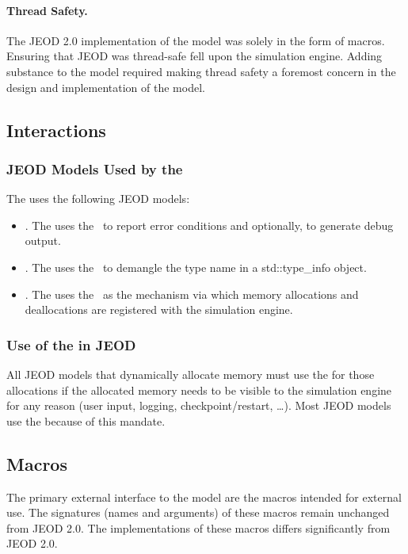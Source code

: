 \paragraph{Thread Safety.} The JEOD 2.0 implementation of the model was
solely in the form of macros. Ensuring that JEOD was thread-safe fell upon the
simulation engine. Adding substance to the model required making thread safety a foremost concern in the design and implementation of the model.

\subsection{Interactions}

\subsubsection{JEOD Models Used by the \ModelDesc}
The \ModelDesc uses the following JEOD models:
\begin{itemize}
\item{}. The \ModelDesc uses the \MESSAGE\ to report error conditions and optionally, to generate debug output.
\item{}. The \ModelDesc uses the \NAMEDITEM\ to demangle the type name in a std::type\_info object.
\item{}. The \ModelDesc uses the \SIMINTERFACE\ as the mechanism via which memory allocations and deallocations are registered with
the simulation engine.
\end{itemize}

\subsubsection{Use of the \ModelDesc in JEOD}
All JEOD models that dynamically allocate memory must use the \ModelDesc for
those allocations if the allocated memory needs to be visible to the simulation
engine for any reason (user input, logging, checkpoint/restart, \ldots).
Most JEOD models use the \ModelDesc because of this mandate.

\subsection{Macros}
The primary external interface to the model are the \ModelDesc macros intended
for external use. The signatures (names and arguments) of these macros
remain unchanged from JEOD 2.0. The implementations of these macros differs
significantly from JEOD 2.0.

